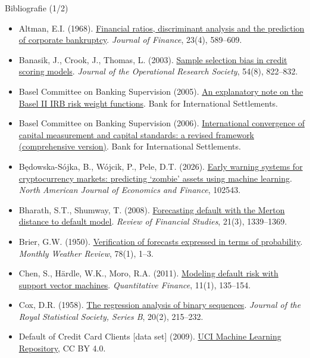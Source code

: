 \begin{frame}{Bibliografie (1/2)}
\itemsize{\tiny}
\begin{itemize}
    \item Altman, E.I. (1968). \href{https://doi.org/10.1111/j.1540-6261.1968.tb00843.x}{Financial ratios, discriminant analysis and the prediction of corporate bankruptcy}. \textit{Journal of Finance}, 23(4), 589--609.
    \item Banasik, J., Crook, J., Thomas, L. (2003). \href{https://doi.org/10.1057/palgrave.jors.2601578}{Sample selection bias in credit scoring models}. \textit{Journal of the Operational Research Society}, 54(8), 822--832.
    \item Basel Committee on Banking Supervision (2005). \href{https://www.bis.org/bcbs/irbriskweight.htm}{An explanatory note on the Basel II IRB risk weight functions}. Bank for International Settlements.
    \item Basel Committee on Banking Supervision (2006). \href{https://www.bis.org/publ/bcbs128.htm}{International convergence of capital measurement and capital standards: a revised framework (comprehensive version)}. Bank for International Settlements.
    \item Będowska-Sójka, B., Wójcik, P., Pele, D.T. (2026). \href{https://doi.org/10.1016/j.najef.2025.102543}{Early warning systems for cryptocurrency markets: predicting `zombie' assets using machine learning}. \textit{North American Journal of Economics and Finance}, 102543.
    \item Bharath, S.T., Shumway, T. (2008). \href{https://doi.org/10.1093/rfs/hhn044}{Forecasting default with the Merton distance to default model}. \textit{Review of Financial Studies}, 21(3), 1339--1369.
    \item Brier, G.W. (1950). \href{https://doi.org/10.1175/1520-0493(1950)078<0001:VOFEIT>2.0.CO;2}{Verification of forecasts expressed in terms of probability}. \textit{Monthly Weather Review}, 78(1), 1--3.
    \item Chen, S., Härdle, W.K., Moro, R.A. (2011). \href{https://doi.org/10.1080/14697680903410015}{Modeling default risk with support vector machines}. \textit{Quantitative Finance}, 11(1), 135--154.
    \item Cox, D.R. (1958). \href{https://doi.org/10.1111/j.2517-6161.1958.tb00292.x}{The regression analysis of binary sequences}. \textit{Journal of the Royal Statistical Society, Series B}, 20(2), 215--232.
    \item Default of Credit Card Clients [data set] (2009). \href{https://doi.org/10.24432/C55S3H}{UCI Machine Learning Repository}, CC BY 4.0.

\end{itemize}
\end{frame}
